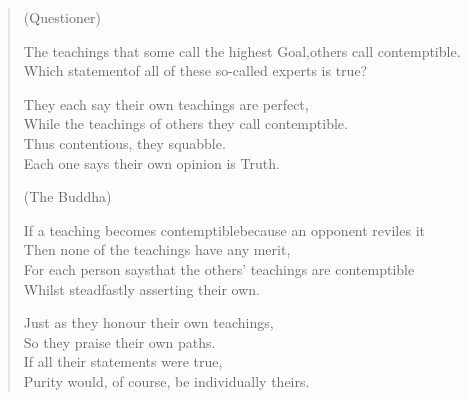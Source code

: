 \begin{verse}

(Questioner)

 The teachings that some call the highest Goal,\newline others call contemptible.\\
Which statement\newline of all of these so-called experts is true?


 They each say their own teachings are perfect,\\
While the teachings of others they call contemptible.\\
Thus contentious, they squabble.\\
Each one says their own opinion is Truth.


(The Buddha)

 If a teaching becomes contemptible\newline because an opponent reviles it\\
Then none of the teachings have any merit,\\
For each person says\newline that the others' teachings are contemptible\\
Whilst steadfastly asserting their own.


 Just as they honour their own teachings,\\
So they praise their own paths.\\
If all their statements were true,\\
Purity would, of course, be individually theirs.


\end{verse}
